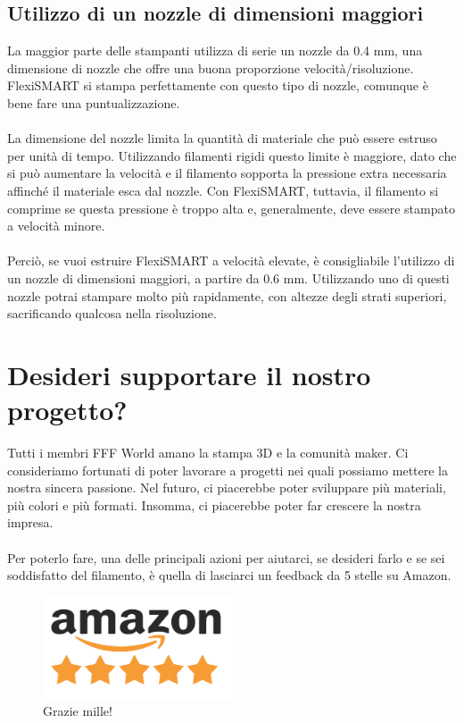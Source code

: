 \documentclass[11pt,a4paper]{article}
\begin{document}
	\subsection{Utilizzo di un nozzle di dimensioni maggiori }
La maggior parte delle stampanti utilizza di serie un nozzle da 0.4 mm, una dimensione di nozzle che offre una buona proporzione velocità/risoluzione. FlexiSMART si stampa perfettamente con questo tipo di nozzle, comunque è bene fare una puntualizzazione.
\\\\
La dimensione del nozzle limita la quantità di materiale che può essere estruso per unità di tempo. Utilizzando filamenti rigidi questo limite è maggiore, dato che si può aumentare la velocità e il filamento sopporta la pressione extra necessaria affinché il materiale esca dal nozzle. Con FlexiSMART, tuttavia, il filamento si comprime se questa pressione è troppo alta e, generalmente, deve essere stampato a velocità minore. 
\\\\
Perciò, se vuoi estruire FlexiSMART a velocità elevate, è consigliabile l'utilizzo di un nozzle di dimensioni maggiori, a partire da 0.6 mm. Utilizzando uno di questi nozzle potrai stampare molto più rapidamente, con altezze degli strati superiori, sacrificando qualcosa nella risoluzione. 
\section{Desideri supportare il nostro progetto?}
Tutti i membri FFF World amano la stampa 3D e la comunità maker. Ci consideriamo fortunati di poter lavorare a progetti nei quali possiamo mettere la nostra sincera passione. Nel futuro, ci piacerebbe poter sviluppare più materiali, più colori e più formati. Insomma, ci piacerebbe poter far crescere la nostra impresa.
\\\\
Per poterlo fare, una delle principali azioni per aiutarci, se desideri farlo e se sei soddisfatto del filamento, è quella di lasciarci un feedback da 5 stelle su Amazon.
\begin{figure}[H]
\centering
\includegraphics[width=0.5\textwidth,cfbox=azul_marcos 1pt 0pt]{FOTOS/AMAZON_FIVE_STARS}
\caption*{Grazie mille!}
\end{figure}
\end{document}
